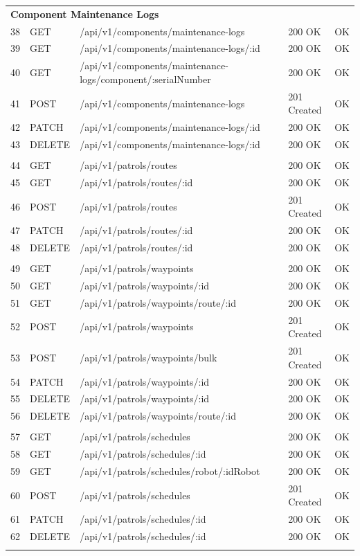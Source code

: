 \begin{longtable}{p{0.7cm} p{1.4cm} p{7cm} p{2.2cm} p{1.2cm}}
\multicolumn{5}{l}{\textbf{Component Maintenance Logs}}\\
38 & GET & /api/v1/components/maintenance-logs & 200 OK & OK \\
39 & GET & /api/v1/components/maintenance-logs/:id & 200 OK & OK \\
40 & GET & /api/v1/components/maintenance-logs/component/:serialNumber & 200 OK & OK \\
41 & POST & /api/v1/components/maintenance-logs & 201 Created & OK \\
42 & PATCH & /api/v1/components/maintenance-logs/:id & 200 OK & OK \\
43 & DELETE & /api/v1/components/maintenance-logs/:id & 200 OK & OK \\
\addlinespace

\multicolumn{5}{l}{\textbf{Patrol Routes}}\\
44 & GET & /api/v1/patrols/routes & 200 OK & OK \\
45 & GET & /api/v1/patrols/routes/:id & 200 OK & OK \\
46 & POST & /api/v1/patrols/routes & 201 Created & OK \\
47 & PATCH & /api/v1/patrols/routes/:id & 200 OK & OK \\
48 & DELETE & /api/v1/patrols/routes/:id & 200 OK & OK \\
\addlinespace

\multicolumn{5}{l}{\textbf{Patrol Waypoints}}\\
49 & GET & /api/v1/patrols/waypoints & 200 OK & OK \\
50 & GET & /api/v1/patrols/waypoints/:id & 200 OK & OK \\
51 & GET & /api/v1/patrols/waypoints/route/:id & 200 OK & OK \\
52 & POST & /api/v1/patrols/waypoints & 201 Created & OK \\
53 & POST & /api/v1/patrols/waypoints/bulk & 201 Created & OK \\
54 & PATCH & /api/v1/patrols/waypoints/:id & 200 OK & OK \\
55 & DELETE & /api/v1/patrols/waypoints/:id & 200 OK & OK \\
56 & DELETE & /api/v1/patrols/waypoints/route/:id & 200 OK & OK \\
\addlinespace

\multicolumn{5}{l}{\textbf{Patrol Schedules}}\\
57 & GET & /api/v1/patrols/schedules & 200 OK & OK \\
58 & GET & /api/v1/patrols/schedules/:id & 200 OK & OK \\
59 & GET & /api/v1/patrols/schedules/robot/:idRobot & 200 OK & OK \\
60 & POST & /api/v1/patrols/schedules & 201 Created & OK \\
61 & PATCH & /api/v1/patrols/schedules/:id & 200 OK & OK \\
62 & DELETE & /api/v1/patrols/schedules/:id & 200 OK & OK \\
\addlinespace


\end{longtable}
